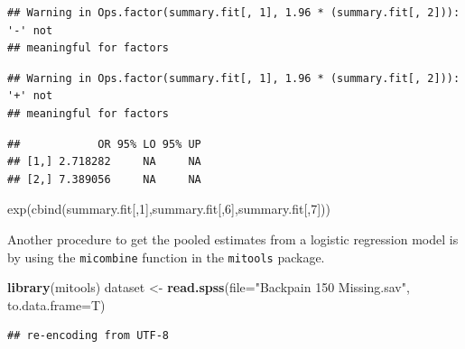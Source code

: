 \documentclass[
]{book}
\newenvironment{Shaded}{\begin{snugshade}}{\end{snugshade}}
\newcommand{\DataTypeTok}[1]{\textcolor[rgb]{0.13,0.29,0.53}{#1}}
\newcommand{\KeywordTok}[1]{\textcolor[rgb]{0.13,0.29,0.53}{\textbf{#1}}}
\newcommand{\NormalTok}[1]{#1}
\newcommand{\StringTok}[1]{\textcolor[rgb]{0.31,0.60,0.02}{#1}}
\begin{document}
\begin{verbatim}
## Warning in Ops.factor(summary.fit[, 1], 1.96 * (summary.fit[, 2])): '-' not
## meaningful for factors
\end{verbatim}

\begin{verbatim}
## Warning in Ops.factor(summary.fit[, 1], 1.96 * (summary.fit[, 2])): '+' not
## meaningful for factors
\end{verbatim}

\begin{Shaded}
\end{Shaded}

\begin{verbatim}
##            OR 95% LO 95% UP
## [1,] 2.718282     NA     NA
## [2,] 7.389056     NA     NA
\end{verbatim}

exp(cbind(summary.fit{[},1{]},summary.fit{[},6{]},summary.fit{[},7{]}))

Another procedure to get the pooled estimates from a logistic regression
model is by using the \texttt{micombine} function in the
\texttt{mitools} package.

\begin{Shaded}
\begin{Highlighting}[]
\KeywordTok{library}\NormalTok{(mitools)}
\NormalTok{dataset <-}\StringTok{ }\KeywordTok{read.spss}\NormalTok{(}\DataTypeTok{file=}\StringTok{"Backpain 150 Missing.sav"}\NormalTok{, }\DataTypeTok{to.data.frame=}\NormalTok{T)}
\end{Highlighting}
\end{Shaded}

\begin{verbatim}
## re-encoding from UTF-8
\end{verbatim}
\end{document}

